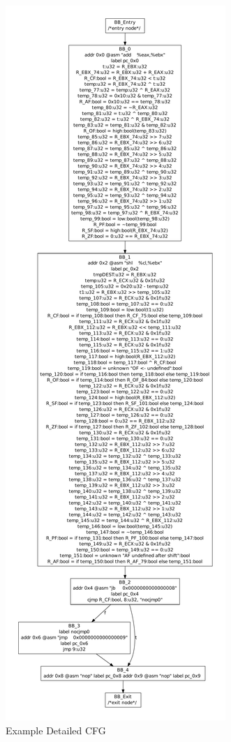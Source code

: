 \begin{figure}[!p]
  \begin{center}
    \includegraphics[height=.9\textheight]{chap-examples/cfg.pdf}
  \end{center}
  \caption{Example Detailed CFG}
  \label{fig:cfg}
\end{figure}

